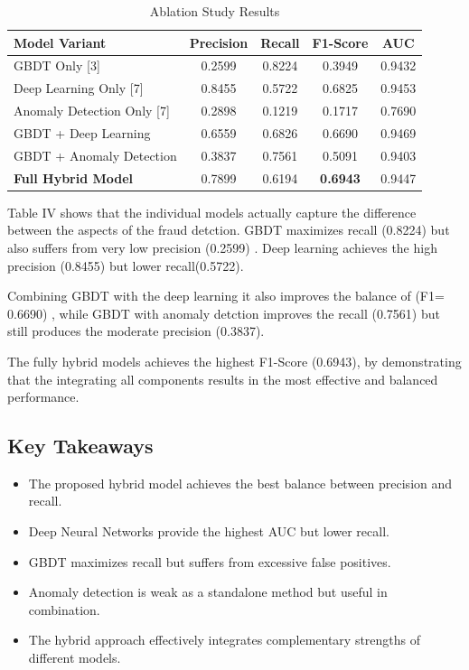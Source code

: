 \documentclass[conference]{IEEEtran}
\begin{document}
\begin{table}[h]
\centering
\caption{Ablation Study Results}
\begin{tabular}{lcccc}
\hline
Model Variant & Precision & Recall & F1-Score & AUC \\
\hline
GBDT Only [3] & 0.2599 & 0.8224 & 0.3949 & 0.9432 \\
Deep Learning Only [7] & 0.8455 & 0.5722 & 0.6825 & 0.9453 \\
Anomaly Detection Only [7] & 0.2898 & 0.1219 & 0.1717 & 0.7690 \\
GBDT + Deep Learning & 0.6559 & 0.6826 & 0.6690 & 0.9469 \\
GBDT + Anomaly Detection & 0.3837 & 0.7561 & 0.5091 & 0.9403 \\
\textbf{Full Hybrid Model} & 0.7899 & 0.6194 & \textbf{0.6943} & 0.9447 \\
\hline
\end{tabular}
\end{table}

Table IV shows that the individual models actually capture the difference between the aspects of the fraud detction. GBDT maximizes recall (0.8224) but also suffers from very low precision (0.2599) . Deep learning achieves the high precision (0.8455) but lower recall(0.5722).

Combining GBDT with the deep learning it also improves the balance of (F1= 0.6690) , while GBDT with anomaly detction improves the recall (0.7561) but still produces the moderate precision (0.3837).

The fully hybrid models achieves the highest F1-Score (0.6943), by demonstrating that the integrating all components results in the most effective and balanced performance.


\subsection{Key Takeaways}

\begin{itemize}
    \item The proposed hybrid model achieves the best balance between precision and recall.
    \item Deep Neural Networks provide the highest AUC but lower recall.
    \item GBDT maximizes recall but suffers from excessive false positives.
    \item Anomaly detection is weak as a standalone method but useful in combination.
    \item The hybrid approach effectively integrates complementary strengths of different models.
\end{itemize}
\end{document}
